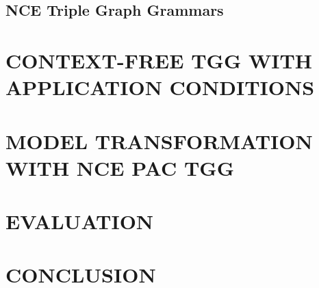 \documentclass[a4paper,twoside]{article}
\begin{document}
\noindent

\subsection{NCE Triple Graph Grammars}

\noindent

\section{\uppercase{Context-free TGG with Application Conditions}}

\noindent

\section{\uppercase{Model Transformation with NCE PAC TGG}}

\noindent

\section{\uppercase{Evaluation}}

\noindent

\section{\uppercase{Conclusion}}

\noindent


\vfill

{\small
}

\vfill
\end{document}
